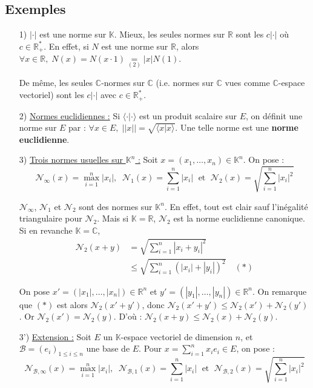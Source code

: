 \documentclass[12pt]{book}
\let\ensembleNombre\mathbb
\newcommand*\R{\ensuremath{\ensembleNombre{R}}}
\newcommand*\C{\ensuremath{\ensembleNombre{C}}}
\newcommand*\K{\ensuremath{\ensembleNombre{K}}}
\newcommand*\B{\ensuremath{\mathcal B}}
\theoremstyle{definition}
\theoremstyle{remark}
\begin{document}
		\subsection{Exemples}
	\begin{itemize}
	\item[1)] $|\cdot|$ est une norme sur $\K$. Mieux, les seules normes sur $\R$ sont les $c|\cdot|$ où $c \in \R_+^*$. En effet, si $N$ est une norme sur $\R$, alors $\forall x \in \R,\; N(x) = N(x\cdot 1) \underset{(2)}{=} |x|N(1)$. 
	
	De même, les seules $\C$-normes sur $\C$ (i.e. normes sur $\C$ vues comme $\C$-espace vectoriel) sont les $c|\cdot|$ avec $c \in \R_+^*$.
	
	\item[2)] \underline{Normes euclidiennes :} Si $\langle \cdot | \cdot \rangle$ est un produit scalaire sur $E$, on définit une norme sur $E$ par : $\forall x \in E,\; ||x|| = \sqrt{ \langle x | x\rangle}$. Une telle norme est une \textbf{norme euclidienne}.
	
	\item[3)] \underline{Trois normes usuelles sur $\K^n$ :} Soit $x = (x_1, \ldots, x_n) \in \K^n$. On pose :
	\[
	\mathcal N_{\infty} (x) = \max_{i=1}^n |x_i|,\;\;
	\mathcal N_1 (x) = \sum_{i=1}^n |x_i| \;\text{ et }\;
	\mathcal N_2(x) = \sqrt{\sum_{i=1}^n |x_i|^2}
	\]
	
	$\mathcal N_\infty$, $\mathcal N_1$ et $\mathcal N_2$ sont des normes sur $\K^n$. En effet, tout est clair sauf l'inégalité triangulaire pour $\mathcal N_2$. Mais si $\K = \R$, $\mathcal N_2$ est la norme euclidienne canonique. Si en revanche $\K = \C$, 
	\begin{align*}
	\mathcal N_2(x+y) &= \sqrt{ \sum_{i=1}^n |x_i + y_i |^2} \\
	&\leq \sqrt{ \sum_{i=1}^n \left( |x_i| + |y_i| \right)^2} \quad (*)
	\end{align*}
	
	On pose $x' = (|x_1|, \ldots, |x_n|) \in \R^n$ et $y' = (|y_1|, \ldots, |y_n|) \in \R^n$. On remarque que $(*)$ est alors $\mathcal N_2(x' + y')$, donc $\mathcal N_2(x' + y') \leq \mathcal N_2(x') + \mathcal N_2(y')$. Or $\mathcal N_2(x') = \mathcal N_2(y)$. D'où : $\boxed{ \mathcal N_2(x+y) \leq \mathcal N_2(x) + \mathcal N_2(y).}$
	
	\item[3')] \underline{Extension :} Soit $E$ un $\K$-espace vectoriel de dimension $n$, et $\B = (e_i)_{1 \leq i \leq n}$ une base de $E$. Pour $x = \sum_{i=1}^n x_ie_i \in E$, on pose : 
	\[
	\mathcal N_{\B, \infty} (x) = \max_{i=1}^n |x_i|,\;\;
	\mathcal N_{\B, 1} (x) = \sum_{i=1}^n |x_i| \;\text{ et }\;
	\mathcal N_{\B, 2} (x) = \sqrt{\sum_{i=1}^n |x_i|^2}
	\]
	

\end{itemize}
\end{document}
